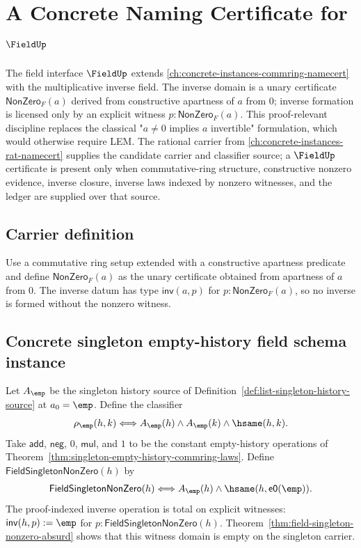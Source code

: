 \chapter{A Concrete Naming Certificate for $\FieldUp$}
\label{ch:concrete-instances-field-namecert}

The field interface $\FieldUp$ extends \autoref{ch:concrete-instances-commring-namecert} with the multiplicative inverse field. The inverse domain is a unary certificate $\mathsf{NonZero}_F(a)$ derived from constructive apartness of $a$ from $0$; inverse formation is licensed only by an explicit witness $p:\mathsf{NonZero}_F(a)$. This proof-relevant discipline replaces the classical "$a \ne 0$ implies $a$ invertible" formulation, which would otherwise require LEM. The rational carrier from \autoref{ch:concrete-instances-rat-namecert} supplies the candidate carrier and classifier source; a $\FieldUp$ certificate is present only when commutative-ring structure, constructive nonzero evidence, inverse closure, inverse laws indexed by nonzero witnesses, and the ledger are supplied over that source.

\section{Carrier definition}

\begin{definition}
\label{def:field-carrier}
Use a commutative ring setup extended with a constructive apartness predicate and define $\mathsf{NonZero}_F(a)$ as the unary certificate obtained from apartness of $a$ from $0$. The inverse datum has type $\mathsf{inv}(a,p)$ for $p:\mathsf{NonZero}_F(a)$, so no inverse is formed without the nonzero witness.
\end{definition}

\section{Concrete singleton empty-history field schema instance}
\label{sec:field-concrete-singleton-instance}

\begin{definition}
\label{def:singleton-empty-history-field-schema-instance}
Let $A_{\emp}$ be the singleton history source of
Definition~\ref{def:list-singleton-history-source} at $a_0=\emp$. Define the
classifier
$$
\rho_{\emp}(h,k)\Longleftrightarrow
A_{\emp}(h)\land A_{\emp}(k)\land\hsame(h,k).
$$
Take $\mathsf{add}$, $\mathsf{neg}$, $0$, $\mathsf{mul}$, and $1$ to be the
constant empty-history operations of
Theorem~\ref{thm:singleton-empty-history-commring-laws}. Define
$\mathsf{FieldSingletonNonZero}(h)$ by
$$
\mathsf{FieldSingletonNonZero}(h)\Longleftrightarrow
A_{\emp}(h)\land \hsame(h,\mathsf{e0}(\emp)).
$$
The proof-indexed inverse operation is total on explicit witnesses:
$\mathsf{inv}(h,p):=\emp$ for
$p:\mathsf{FieldSingletonNonZero}(h)$. Theorem~\ref{thm:field-singleton-nonzero-absurd}
shows that this witness domain is empty on the singleton carrier.
\end{definition}

